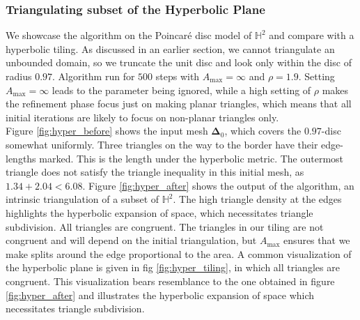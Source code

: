 \subsubsection*{Triangulating subset of the Hyperbolic Plane}
    We showcase the algorithm on the Poincaré disc model of $\mathbb{H}^2$ and compare with a hyperbolic tiling. As discussed in an earlier section, we cannot triangulate an unbounded domain, so we truncate the unit disc and look only within the disc of radius $0.97$. Algorithm run for $500$ steps with $A_{\text{max}} = \infty$ and $\rho = 1.9$. Setting $A_{\text{max}} = \infty$ leads to the parameter being ignored, while a high setting of $\rho$ makes the refinement phase focus just on making planar triangles, which means that all initial iterations are likely to focus on non-planar triangles only. 
    \\
    Figure \ref{fig:hyper_before} shows the input mesh $\mathbf{\Delta}_0$, which covers the $0.97$-disc somewhat uniformly. Three triangles on the way to the border have their edge-lengths marked. This is the length under the hyperbolic metric. The outermost triangle does not satisfy the triangle inequality in this initial mesh, as $1.34 + 2.04 < 6.08$. Figure \ref{fig:hyper_after} shows the output of the algorithm, an intrinsic triangulation of a subset of $\mathbb{H}^2$. The high triangle density at the edges highlights the hyperbolic expansion of space, which necessitates triangle subdivision. All triangles are congruent. The triangles in our tiling are not congruent and will depend on the initial triangulation, but $A_{\text{max}}$ ensures that we make splits around the edge proportional to the area. A common visualization of the hyperbolic plane is given in fig \ref{fig:hyper_tiling}, in which all triangles are congruent. This visualization bears resemblance to the one obtained in figure \ref{fig:hyper_after} and illustrates the hyperbolic expansion of space which necessitates triangle subdivision.
    \\

